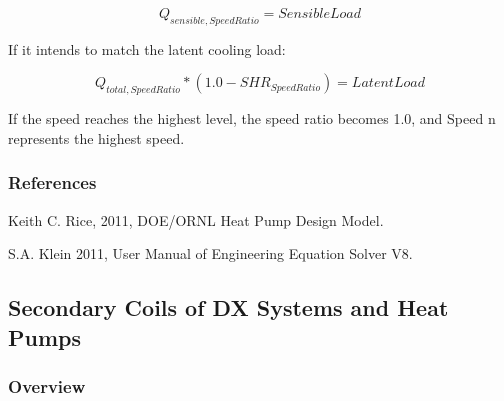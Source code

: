 \begin{equation}
{Q_{sensible,SpeedRatio}} = SensibleLoad
\end{equation}

If it intends to match the latent cooling load:

\begin{equation}
{Q_{total,SpeedRatio}}*\left( {1.0 - SH{R_{SpeedRatio}}} \right) = LatentLoad
\end{equation}

If the speed reaches the highest level, the speed ratio becomes 1.0, and Speed n represents the highest speed.

\subsubsection{References}\label{references-9}

Keith C. Rice, 2011, DOE/ORNL Heat Pump Design Model.

S.A. Klein 2011, User Manual of Engineering Equation Solver V8.

\subsection{Secondary Coils of DX Systems and Heat Pumps}\label{secondary-coils-of-dx-systems-and-heat-pumps}

\subsubsection{Overview}\label{overview-15}

